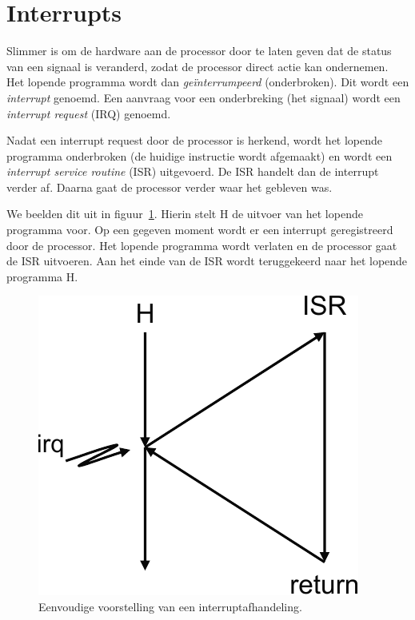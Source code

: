 \section{Interrupts}
Slimmer is om de hardware aan de processor door te laten geven dat de status
van een signaal is veranderd, zodat de processor direct actie kan ondernemen.
Het lopende programma wordt dan \textsl{geïnterrumpeerd} (onderbroken).
Dit wordt een \textsl{interrupt} genoemd. Een aanvraag voor een onderbreking
(het signaal) wordt een \textsl{interrupt request} (IRQ) genoemd.

Nadat een interrupt request door de processor is herkend, wordt het lopende
programma onderbroken (de huidige instructie wordt afgemaakt) en wordt een
\textsl{interrupt service routine} (ISR) uitgevoerd. De ISR handelt dan de
interrupt verder af. Daarna gaat de processor verder waar het gebleven was.

We beelden dit uit in figuur~\ref{fig:intsimpleinterruptdispatch}. Hierin
stelt \textsf{H} de uitvoer van het lopende programma voor. Op een gegeven
moment wordt er een interrupt geregistreerd door de processor. Het lopende
programma wordt verlaten en de processor gaat de ISR uitvoeren. Aan het einde
van de ISR wordt teruggekeerd naar het lopende programma \textsf{H}.

\begin{figure}[!ht]
\centering
\includegraphics[scale=\figscale]{images/intsimpleinterruptdispatch}
\caption{Eenvoudige voorstelling van een interruptafhandeling.}
\label{fig:intsimpleinterruptdispatch}
\end{figure}

